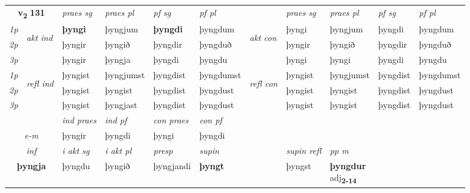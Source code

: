 \noindent
\begin{tabular}{lllllllllll} \toprule
\multicolumn{2}{c}{\textbf{v{\textsubscript{2}}} \Large{\textbf{131}}}  &  \textit{praes sg}  & \textit{praes pl}  &\textit{ pf sg} & \textit{pf pl} &  &  \textit{praes sg}  & \textit{praes pl}  & \textit{pf sg} & \textit{pf pl } \\*
	\cmidrule{3-6} \cmidrule{8-11}
 {\textit{1p}} & \multirow{3}{*}{\begin{turn}{90}\textit{akt ind}\end{turn}} & \textbf{þyngi} & þyngjum & \textbf{þyngdi} & þyngdum & \multirow{3}{*}{\begin{turn}{90}\textit{akt con}\end{turn}} &þyngi & þyngjum & þyngdi & þyngdum\\*
 {\textit{2p}} &  &  þyngir  & þyngið & þyngdir & þyngduð & & þyngir & þyngið & þyngdir & þyngduð \\*
{\textit{3p}} &  & þyngir & þyngja & þyngdi & þyngdu & & þyngi & þyngi& þyngdi & þyngdu \\*
\cmidrule{3-6} \cmidrule{8-11}
 {\textit{1p}} & \multirow{3}{*}{\begin{turn}{90}\textit{refl ind}\end{turn}}  & þyngist & þyngjumst & þyngdist & þyngdumst & \multirow{3}{*}{\begin{turn}{90}\textit{refl con}\end{turn}}  &þyngist & þyngjumst & þyngdist & þyngdumst \\*
 {\textit{2p}} &  & þyngist & þyngist & þyngdist & þyngdust & &þyngist & þyngist & þyngdist & þyngdust \\*
 {\textit{3p}}  & & þyngist & þyngjast & þyngdist & þyngdust & & þyngist & þyngist& þyngdist & þyngdust \\*
\cmidrule{3-6} \cmidrule{8-11}

   & &  \textit{ind praes} & \textit{ind pf} & \textit{con praes} & \textit{con pf} \\*
\multicolumn{2}{c}{ \textit{e-m} } & þyngir & þyngdi & þyngi & þyngdi \\*

\cmidrule{3-9}
   \multicolumn{2}{c}{\textit{inf}}  & \textit{i akt sg} & \textit{i akt pl}   & \textit{presp} & \textit{supin} && \textit{supin refl} & \textit{pp m} \\*
  \multicolumn{2}{c}{\textbf{þyngja}} & þyngdu  & þyngið   & þyngjandi &  \textbf{þyngt} && þyngst & \specialcell{\textbf{þyngdur} \\ adj\textbf{\textsubscript{2-14}}} \\*
\end{tabular}

